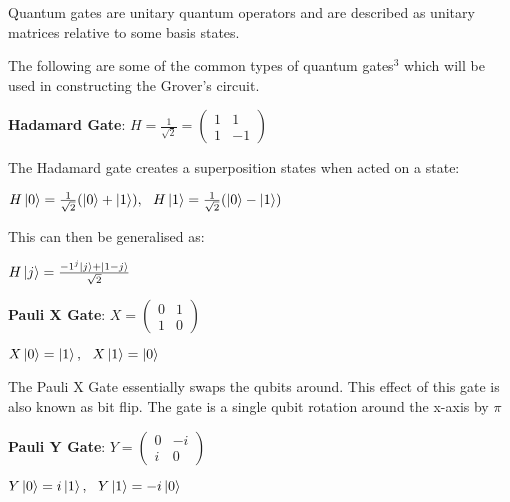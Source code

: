 \documentclass{article}
\begin{document}
Quantum gates are unitary quantum operators and are described as unitary matrices relative to some basis states.
\vspace{5mm}

\noindent
The following are some of the common types of quantum gates\hyperlink{3}{$^3$} which will be used in constructing the Grover's circuit.
\vspace{5mm}

\textbf{Hadamard Gate}: \qquad $H = \frac{1}{\sqrt{2}}= \begin{pmatrix} 1 & 1 \\ 1 & -1 \end{pmatrix}$
\vspace{5mm}

\noindent
The Hadamard gate creates a superposition states when acted on a state:
\vspace{5mm}


\qquad $H\ket{0} = \frac{1}{\sqrt{2}} (\ket{0} + \ket{1}), \ \ H\ket{1} = \frac{1}{\sqrt{2}}(\ket{0} - \ket{1}) $
\vspace{5mm}

\noindent
This can then be generalised as:
\vspace{5mm}


\qquad $ H\ket{j} = \frac{-1^j\ket{j} + \ket{1 - j}}{\sqrt{2}} $
\vspace{5mm}


\textbf{Pauli X Gate}: \qquad $X = \begin{pmatrix} 0 & 1 \\ 1 & 0 \end{pmatrix}$
\vspace{5mm}


\qquad $X\ket{0} = \ket{1} , \ \ X\ket{1} = \ket{0}$
\vspace{5mm}

\noindent
The Pauli X Gate essentially swaps the qubits around. This effect of this gate is also known as bit flip. The gate is a single qubit rotation around the x-axis by $\pi$
\vspace{5mm}


\textbf{Pauli Y Gate}: \qquad $Y = \begin{pmatrix} 0 & -i \\ i & 0 \end{pmatrix}$
\vspace{5mm}


\qquad $Y\ket{0} = i\ket{1} , \ \ Y\ket{1} = -i\ket{0}$
\vspace{5mm}
\end{document}
